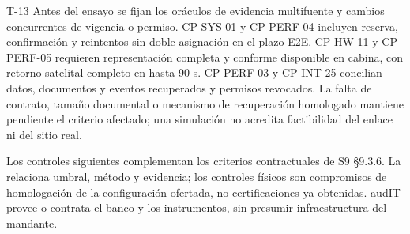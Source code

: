 \begin{formulario}{T-13}
Antes del ensayo se fijan los oráculos de evidencia multifuente y cambios concurrentes de vigencia o permiso. CP-SYS-01 y CP-PERF-04 incluyen reserva, confirmación y reintentos sin doble asignación en el plazo E2E. CP-HW-11 y CP-PERF-05 requieren representación completa y conforme disponible en cabina, con retorno satelital completo en hasta 90 s. CP-PERF-03 y CP-INT-25 concilian datos, documentos y eventos recuperados y permisos revocados. La falta de contrato, tamaño documental o mecanismo de recuperación homologado mantiene pendiente el criterio afectado; una simulación no acredita factibilidad del enlace ni del sitio real.

Los controles siguientes complementan los criterios contractuales de S9 §9.3.6. La  relaciona umbral, método y evidencia; los controles físicos son compromisos de homologación de la configuración ofertada, no certificaciones ya obtenidas. audIT provee o contrata el banco y los instrumentos, sin presumir infraestructura del mandante.



\end{formulario}
